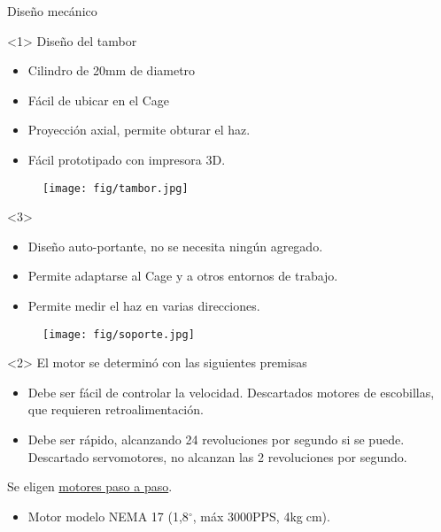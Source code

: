 \begin{frame}{Diseño mecánico}
\begin{onlyenv}<1>
Diseño del tambor

\begin{minipage}[t]{0.5\textwidth}
\begin{itemize}
\item Cilindro de 20mm de diametro
\item Fácil de ubicar en el Cage
\item Proyección axial, permite obturar el haz.
\item Fácil prototipado con impresora 3D.
\end{itemize}
\end{minipage}
%
\begin{minipage}[t]{0.45\textwidth}
\begin{figure}[H]
\centering
\texttt{[image: fig/tambor.jpg]}
\label{fig:tambor}
\end{figure}
\end{minipage}
\end{onlyenv}


\begin{onlyenv}<3>
\begin{minipage}[t]{0.45\textwidth}
\begin{itemize}
\item Diseño auto-portante, no se necesita ningún agregado.
\item Permite adaptarse al Cage y a otros entornos de trabajo.
\item Permite medir el haz en varias direcciones.
\end{itemize}
\end{minipage}
%
\begin{minipage}[t]{0.5\textwidth}
\begin{figure}
\centering
\texttt{[image: fig/soporte.jpg]}
\label{fig:pieza}
\end{figure}
\end{minipage}
\end{onlyenv}

\begin{onlyenv}<2>
El motor se determinó con las siguientes premisas 
\begin{itemize}
\item Debe ser fácil de controlar la velocidad. Descartados motores de escobillas, que requieren retroalimentación.
\item Debe ser rápido, alcanzando 24 revoluciones por segundo si se puede. Descartado servomotores, no alcanzan las 2 revoluciones por segundo.
\end{itemize}
\centering
Se eligen \underline{motores paso a paso}.
\begin{itemize}
\item Motor modelo NEMA 17 (1,8$^\circ$, máx 3000PPS, 4kg$\;$cm).
\end{itemize}
\end{onlyenv}

\end{frame}

